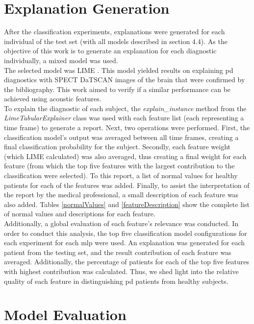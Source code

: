 \section{Explanation Generation}

After the classification experiments, explanations were generated for each individual of the test set (with all models described in section 4.4). As the objective of this work is to generate an explanation for each diagnostic individually, a mixed model was used.
\\
The selected model was LIME \cite{LIME}. This model yielded results on explaining \gls{pd} diagnostics with SPECT DaTSCAN images of the brain that were confirmed by the bibliography. This work aimed to verify if a similar performance can be achieved using acoustic features.
\\
To explain the diagnostic of each subject, the \textit{explain\_instance} method from the \textit{LimeTabularExplainer} class was used with each feature list (each representing a time frame) to generate a report. Next, two operations were performed. First, the classification model's output was averaged between all time frames, creating a final classification probability for the subject. Secondly, each feature weight (which LIME calculated) was also averaged, thus creating a final weight for each feature (from which the top five features with the largest contribution to the classification were selected). To this report, a list of normal values for healthy patients for each of the features was added. Finally, to assist the interpretation of the report by the medical professional, a small description of each feature was also added. Tables \ref{normalValues} and \ref{featureDescription} show the complete list of normal values and descriptions for each feature.
\\
Additionally, a global evaluation of each feature's relevance was conducted. In order to conduct this analysis, the top five classification model configurations for each experiment for each \gls{mlp} were used. An explanation was generated for each patient from the testing set, and the result contribution of each feature was averaged. Additionally, the percentage of patients for each of the top five features with highest contribution was calculated. Thus, we shed light into the relative quality of each feature in distinguishing \gls{pd} patients from healthy subjects.

\section{Model Evaluation}

